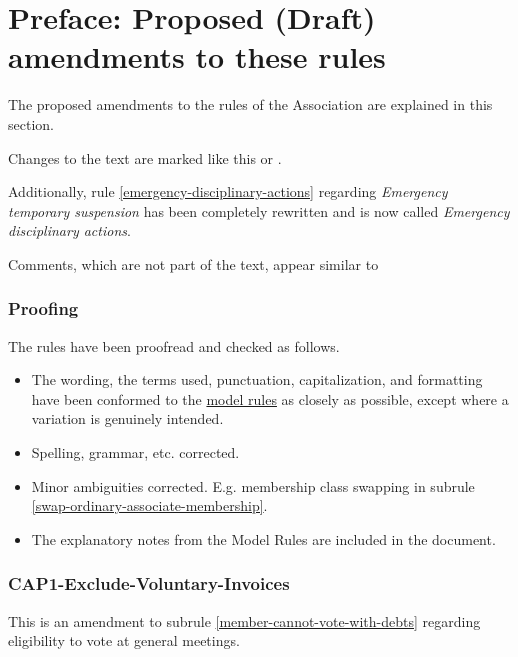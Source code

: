 \documentclass[../constitution.tex]{subfiles}
\begin{document}
\part*{Preface: Proposed (Draft) amendments to these rules}


The proposed amendments to the rules of the Association are explained in this section.

Changes to the text are marked like this or .

Additionally, rule \ref{emergency-disciplinary-actions} regarding \textit{Emergency temporary suspension} has been completely rewritten and is now called \textit{Emergency disciplinary actions}.

Comments, which are not part of the text, appear similar to

\section*{Proofing}

The rules have been proofread and checked as follows.

\begin{itemize}
    \item The wording, the terms used, punctuation, capitalization, and formatting have been conformed to the \href{https://www.commerce.wa.gov.au/consumer-protection/model-rules}{model rules} as closely as possible, except where a variation is genuinely intended.
    \item Spelling, grammar, etc. corrected.
    \item Minor ambiguities corrected. E.g. membership class swapping in subrule \ref{swap-ordinary-associate-membership}.
    \item The explanatory notes from the Model Rules are included in the document.
\end{itemize}

\section*{CAP1-Exclude-Voluntary-Invoices}

This is an amendment to subrule \ref{member-cannot-vote-with-debts} regarding eligibility to vote at general meetings.
\end{document}
